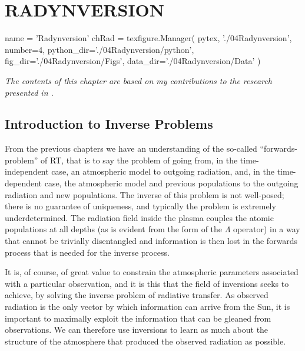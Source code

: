 \chapter{RADYNVERSION}\label{Chap:Radynversion}

\begin{pycode}[Radynversion]
name = 'Radynversion'
chRad = texfigure.Manager(
    pytex,
    './04Radynversion',
    number=4,
    python_dir='./04Radynversion/python',
    fig_dir='./04Radynversion/Figs',
    data_dir='./04Radynversion/Data'
)
\end{pycode}


\emph{The contents of this chapter are based on my contributions to the research presented in \citet{Osborne2019}.}



\section{Introduction to Inverse Problems}

From the previous chapters we have an understanding of the so-called ``forwards-problem'' of RT, that is to say the problem of going from, in the time-independent case, an atmospheric model to outgoing radiation, and, in the time-dependent case, the atmospheric model and previous populations to the outgoing radiation and new populations.
The inverse of this problem is not well-posed; there is no guarantee of uniqueness, and typically the problem is extremely underdetermined.
The radiation field inside the plasma couples the atomic populations at all depths (as is evident from the form of the $\Lambda$ operator) in a way that cannot be trivially disentangled and information is then lost in the forwards process that is needed for the inverse process.

It is, of course, of great value to constrain the atmospheric parameters associated with a particular observation, and it is this that the field of inversions seeks to achieve, by solving the inverse problem of radiative transfer.
As observed radiation is the only vector by which information can arrive from the Sun, it is important to maximally exploit the information that can be gleaned from observations.
We can therefore use inversions to learn as much about the structure of the atmosphere that produced the observed radiation as possible.

